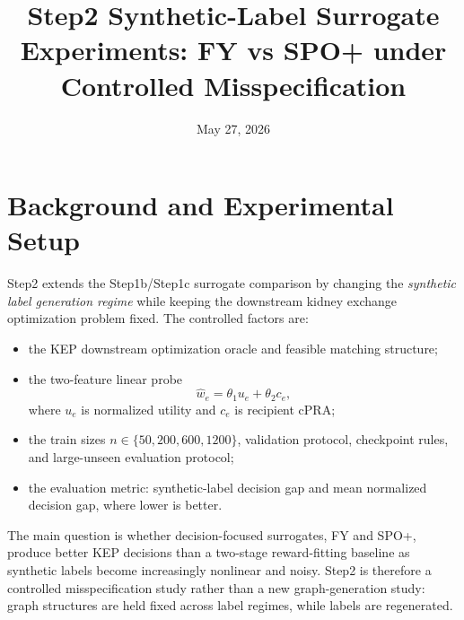 \documentclass[11pt]{article}
\title{Step2 Synthetic-Label Surrogate Experiments: FY vs SPO+ under Controlled Misspecification}
\author{}
\date{May 27, 2026}
\begin{document}
\maketitle

\section{Background and Experimental Setup}

Step2 extends the Step1b/Step1c surrogate comparison by changing the \emph{synthetic label generation regime} while keeping the downstream kidney exchange optimization problem fixed. The controlled factors are:
\begin{itemize}
  \item the KEP downstream optimization oracle and feasible matching structure;
  \item the two-feature linear probe
  \[
    \widehat w_e = \theta_1 u_e + \theta_2 c_e,
  \]
  where \(u_e\) is normalized utility and \(c_e\) is recipient cPRA;
  \item the train sizes \(n\in\{50,200,600,1200\}\), validation protocol, checkpoint rules, and large-unseen evaluation protocol;
  \item the evaluation metric: synthetic-label decision gap and mean normalized decision gap, where lower is better.
\end{itemize}

The main question is whether decision-focused surrogates, FY and SPO+, produce better KEP decisions than a two-stage reward-fitting baseline as synthetic labels become increasingly nonlinear and noisy. Step2 is therefore a controlled misspecification study rather than a new graph-generation study: graph structures are held fixed across label regimes, while labels are regenerated.
\end{document}
